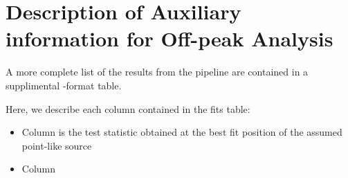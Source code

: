 
\section{Description of Auxiliary information for Off-peak Analysis}

A more complete list of the results from the pipeline are contained
in a supplimental \fits-format table.

Here, we describe each column contained in the fits table:
\begin{itemize}
  \item Column  is the test statistic obtained at the best fit position of the assumed point-like source
  \item Column 
\end{itemize}





